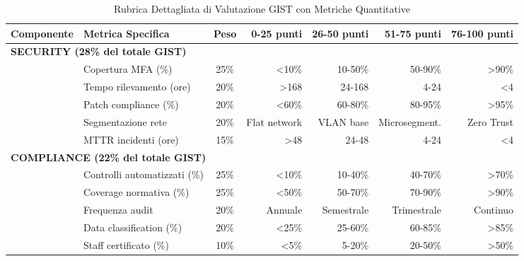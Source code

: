 \begin{landscape}
\begin{table}[H]
\centering
\caption{Rubrica Dettagliata di Valutazione GIST con Metriche Quantitative}
\label{tab:rubrica-dettagliata}
\scriptsize
\setlength{\tabcolsep}{4pt}
\begin{tabular}{l l c r r r r}
\toprule
\textbf{Componente} & \textbf{Metrica Specifica} & \textbf{Peso} & \textbf{0-25 punti} & \textbf{26-50 punti} & \textbf{51-75 punti} & \textbf{76-100 punti} \\
\midrule
\multicolumn{7}{l}{\textbf{SECURITY (28\% del totale GIST)}} \\
\midrule
& Copertura MFA (\%) & 25\% & <10\% & 10-50\% & 50-90\% & >90\% \\
& Tempo rilevamento (ore) & 20\% & >168 & 24-168 & 4-24 & <4 \\
& Patch compliance (\%) & 20\% & <60\% & 60-80\% & 80-95\% & >95\% \\
& Segmentazione rete & 20\% & Flat network & VLAN base & Microsegment. & Zero Trust \\
& MTTR incidenti (ore) & 15\% & >48 & 24-48 & 4-24 & <4 \\
\midrule
\multicolumn{7}{l}{\textbf{COMPLIANCE (22\% del totale GIST)}} \\
\midrule
& Controlli automatizzati (\%) & 25\% & <10\% & 10-40\% & 40-70\% & >70\% \\
& Coverage normativa (\%) & 25\% & <50\% & 50-70\% & 70-90\% & >90\% \\
& Frequenza audit & 20\% & Annuale & Semestrale & Trimestrale & Continuo \\
& Data classification (\%) & 20\% & <25\% & 25-60\% & 60-85\% & >85\% \\
& Staff certificato (\%) & 10\% & <5\% & 5-20\% & 20-50\% & >50\% \\
\bottomrule
\end{tabular}
\end{table}
\end{landscape}